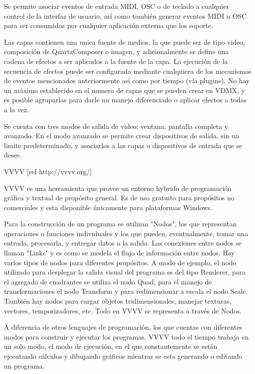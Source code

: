 Se permite asociar eventos de entrada MIDI, OSC o de teclado a cualquier control de la interfaz de usuario, así como también generar eventos MIDI u OSC para ser consumidos por cualquier aplicación externa que los soporte.

Las capas contienen una unica fuente de medios, la que puede ser de tipo video, composición de QuartzComposer o imagen, y adicionalmente se define una cadena de efectos a ser aplicados a la fuente de la capa. La ejecución de la secuencia de efectos puede ser configurada mediante cualquiera de los mecanismos de eventos mencionados anteriormente así como por tiempo (vía plugins). No hay un máximo establecido en el numero de capas que se pueden crear en VDMX, y es posible agruparlas para darle un manejo diferenciado o aplicar efectos a todas a la vez.

Se cuenta con tres modos de salida de video: ventana, pantalla completa y avanzado. En el modo avanzado se permite crear dispositivos de salida, sin un limite predeterminado, y asociarlos a las capas o dispositivos de entrada que se desee.


VVVV
[ref http://vvvv.org/]

VVVV es una herramienta que provee un entorno hybrido de programación gráfica y textual de propósito general. Es de uso gratuito para propósitos no comerciales y esta disponible únicamente para plataformas Windows.

Para la construcción de un programa se utilizan "Nodos", los que representan operaciones o funciones individuales y los que pueden, eventualmente, tomar una entrada, procesarla, y entregar datos a la salida. Las conexiones entre nodos se llaman "Links" y es como se modela el flujo de información entre nodos. Hay varios tipos de nodos para diferentes propósitos. A modo de ejemplo, el nodo utilizado para desplegar la salida visual del programa es del tipo Renderer, para el agregado de cuadrantes se utiliza el nodo Quad, para el manejo de transformaciones el nodo Transform y para redimensionar a escala el nodo Scale. También hay nodos para cargar objetos tridimensionales, manejar texturas, vectores, temporizadores, etc. Todo en VVVV se representa a través de Nodos.

A diferencia de otros lenguajes de programación, los que cuentas con diferentes modos para construir y ejecutar los programas, VVVV todo el tiempo trabaja en un solo modo, el modo de ejecución, en el que constantemente se están ejecutando cálculos y dibujando gráficos mientras se esta generando o editando un programa.

